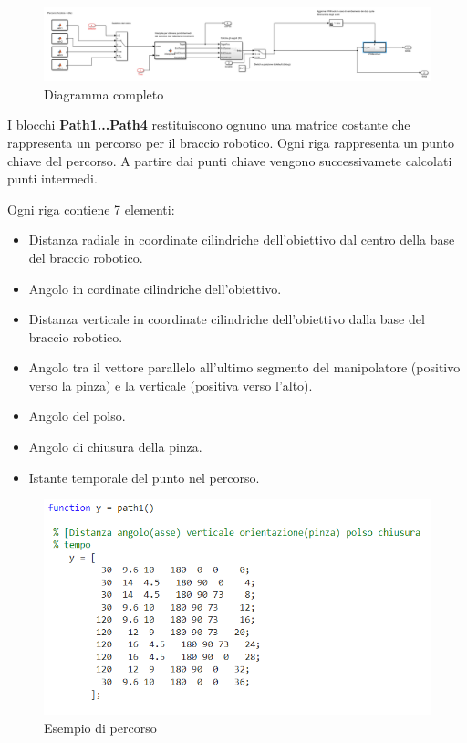 \documentclass[12pt]{report}
\begin{document}
\begin{figure}
\includegraphics[width=\textwidth]{Complete_attuation}
\caption{Diagramma completo}
\end{figure}

I blocchi \textbf{Path1...Path4} restituiscono ognuno una matrice costante che rappresenta un percorso per il braccio robotico. Ogni riga rappresenta un punto chiave del percorso. A partire dai punti chiave vengono successivamete calcolati punti intermedi.

Ogni riga contiene 7 elementi:

\begin{itemize}
\item Distanza radiale in coordinate cilindriche dell'obiettivo dal centro della base del braccio robotico.
\item Angolo in cordinate cilindriche dell'obiettivo.
\item Distanza verticale in coordinate cilindriche dell'obiettivo dalla base del braccio robotico.
\item Angolo tra il vettore parallelo all'ultimo segmento del manipolatore (positivo verso la pinza) e la verticale (positiva verso l'alto).
\item Angolo del polso.
\item Angolo di chiusura della pinza.
\item Istante temporale del punto nel percorso.
\end{itemize}

\begin{figure}
\includegraphics[width=\textwidth]{Path_structure}
\caption{Esempio di percorso}
\end{figure}
\end{document}
